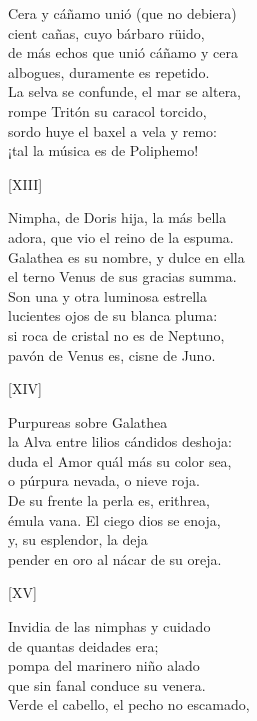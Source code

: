 \documentclass[11pt,a4paper,twoside]{article}
\begin{document}
Cera y cáñamo unió (que no debiera)\\
cient cañas, cuyo bárbaro rüido,\\
de más echos que unió cáñamo y cera\\
albogues, duramente es repetido.\\
La selva se confunde, el mar se altera,\\
rompe Tritón su caracol torcido,\\
sordo huye el baxel a vela y remo:\\
¡tal la música es de Poliphemo!\pend
\begin{center}
	[XIII]
\end{center}\pstart
Nimpha, de Doris hija, la más bella\\
adora, que vio el reino de la espuma.\\
Galathea es su nombre, y dulce en ella\\
el terno Venus de sus gracias summa.\\
Son una y otra luminosa estrella\\
lucientes ojos de su blanca pluma:\\
si roca de cristal no es de Neptuno,\\
pavón de Venus es, cisne de Juno.\pend 
\begin{center}
	[XIV]
\end{center}\pstart
Purpureas  sobre Galathea\\
la Alva entre lilios cándidos deshoja:\\
duda el Amor quál más su color sea,\\
o púrpura nevada, o nieve roja.\\
De su frente la perla es, erithrea,\\
émula vana. El ciego dios se enoja,\\
y,  su esplendor, la deja\\
pender en oro al nácar de su oreja.\pend
\begin{center}
	[XV]
\end{center}\pstart
Invidia de las nimphas y cuidado\\
de quantas  deidades era;\\
pompa del marinero niño alado\\
que sin fanal conduce su venera.\\
Verde el cabello, el pecho no escamado,\\
\end{document}
